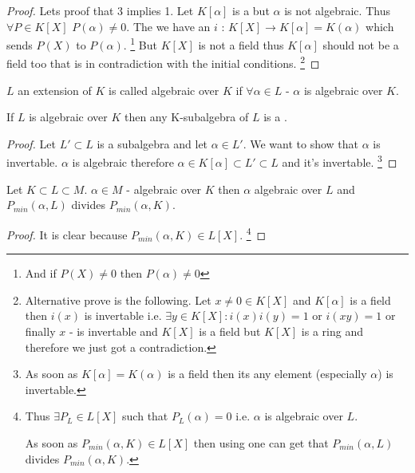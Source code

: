 \begin{proposition}
\begin{proof}
    Lets proof that 3 implies 1. Let $K\left[\alpha\right]$ is a
     but $\alpha$ is not algebraic. Thus $\forall P
    \in K\left[X\right]$ $P(\alpha) \ne 0$. The we have an
      $i$ :
    $K\left[X\right] \to K\left[\alpha\right] = K\left(\alpha\right)$
    which sends $P\left(X\right)$ to $P\left(\alpha\right)$.
    \footnote{
      And if $P\left(X\right) \ne 0$ then
      $P\left(\alpha\right) \ne 0$
    }
    But $K\left[X\right]$
    is not a field thus $K\left[\alpha\right]$ should not be a field
    too that is in contradiction with the initial conditions.
    \footnote{
      Alternative prove is the following.
      Let $x \ne 0 \in K\left[X\right]$ and $K\left[\alpha\right]$ is a
      field then $i(x)$ is invertable i.e. $\exists y \in
      K\left[X\right]:  i(x) i(y) = 1$ or 
      $i(xy) = 1$ or finally $x$ - is invertable and $K\left[X\right]$
      is a field but $K\left[X\right]$ is a ring and therefore we just
      got a contradiction. 
    }
  \end{proof}
  \label{prop:lec1_1}
\end{proposition}

\begin{definition}
  $L$ an extension of $K$ is called algebraic over $K$ if $\forall
  \alpha \in L$ - $\alpha$ is algebraic over $K$. 
  \label{def:algebraicextension}
\end{definition}

\begin{proposition}
  If $L$ is algebraic over $K$ then any K-subalgebra of $L$ is a
  .
  \begin{proof}
    Let $L' \subset L$ is a subalgebra and let $\alpha \in L'$. We want
    to show that $\alpha$ is invertable. $\alpha$ is algebraic
    therefore $\alpha \in K\left[\alpha\right] \subset L' \subset L$
    and it's invertable.
    \footnote{
      As soon as $K\left[\alpha\right] = K\left(\alpha\right)$ is a
      field then its any element (especially $\alpha$) is invertable. 
    }
  \end{proof}
  \label{prop:lec1_algebraicsubalgebra}
\end{proposition}

\begin{proposition}
  Let $K \subset L \subset M$. $\alpha \in M$ - algebraic over $K$
  then $\alpha$ algebraic over $L$ and
  $P_{min}\left(\alpha, L\right)$ divides $P_{min}\left(\alpha,
  K\right)$. 
  \begin{proof}
    It is clear because $P_{min}\left(\alpha,K\right) \in
    L\left[X\right]$.
    \footnote{
      Thus $\exists P_L \in L\left[X\right]$ such that
      $P_L\left(\alpha\right) = 0$ i.e. $\alpha$ is algebraic over $L$.
      
      As soon as $P_{min}\left(\alpha,K\right) \in L\left[X\right]$ then
      using  one can get that
      $P_{min}\left(\alpha,L\right)$ divides
      $P_{min}\left(\alpha,K\right)$.
    }
  \end{proof}
  \label{prop:lec1_algebraic}
\end{proposition}

